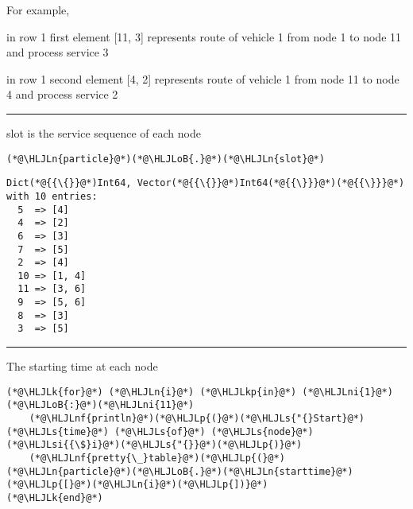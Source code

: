 \documentclass[12pt,a4paper]{article}
\newcommand{\HLJLk}[1]{\textcolor[RGB]{148,91,176}{\textbf{#1}}}
\newcommand{\HLJLkp}[1]{\textcolor[RGB]{148,91,176}{\textbf{#1}}}
\newcommand{\HLJLn}[1]{#1}
\newcommand{\HLJLnf}[1]{\textcolor[RGB]{66,102,213}{#1}}
\newcommand{\HLJLs}[1]{\textcolor[RGB]{201,61,57}{#1}}
\newcommand{\HLJLsi}[1]{#1}
\newcommand{\HLJLni}[1]{\textcolor[RGB]{59,151,46}{#1}}
\newcommand{\HLJLoB}[1]{\textcolor[RGB]{102,102,102}{\textbf{#1}}}
\newcommand{\HLJLp}[1]{#1}
\begin{document}
For example, 

in row 1 first element [11, 3] represents route of vehicle 1 from node 1 to node 11 and process service 3

in row 1 second element [4, 2] represents route of vehicle 1 from node 11 to node 4 and process service 2

\rule{\textwidth}{1pt}
slot is the service sequence of each node


\begin{lstlisting}
(*@\HLJLn{particle}@*)(*@\HLJLoB{.}@*)(*@\HLJLn{slot}@*)
\end{lstlisting}

\begin{lstlisting}
Dict(*@{{\{}}@*)Int64, Vector(*@{{\{}}@*)Int64(*@{{\}}}@*)(*@{{\}}}@*) with 10 entries:
  5  => [4]
  4  => [2]
  6  => [3]
  7  => [5]
  2  => [4]
  10 => [1, 4]
  11 => [3, 6]
  9  => [5, 6]
  8  => [3]
  3  => [5]
\end{lstlisting}


\rule{\textwidth}{1pt}
The starting time at each node 


\begin{lstlisting}
(*@\HLJLk{for}@*) (*@\HLJLn{i}@*) (*@\HLJLkp{in}@*) (*@\HLJLni{1}@*)(*@\HLJLoB{:}@*)(*@\HLJLni{11}@*)
    (*@\HLJLnf{println}@*)(*@\HLJLp{(}@*)(*@\HLJLs{"{}Start}@*) (*@\HLJLs{time}@*) (*@\HLJLs{of}@*) (*@\HLJLs{node}@*) (*@\HLJLsi{{\$}i}@*)(*@\HLJLs{"{}}@*)(*@\HLJLp{)}@*)
    (*@\HLJLnf{pretty{\_}table}@*)(*@\HLJLp{(}@*)(*@\HLJLn{particle}@*)(*@\HLJLoB{.}@*)(*@\HLJLn{starttime}@*)(*@\HLJLp{[}@*)(*@\HLJLn{i}@*)(*@\HLJLp{])}@*)
(*@\HLJLk{end}@*)
\end{lstlisting}
\end{document}
